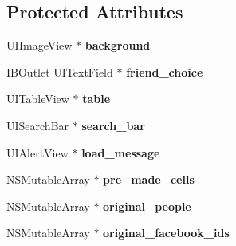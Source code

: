 \subsection*{\-Protected \-Attributes}
\begin{DoxyCompactItemize}
\item 
\hypertarget{interface_facebook_broadcast_aa285a74c8c6922e963c04224a41bb7f3}{
\-U\-I\-Image\-View $\ast$ {\bfseries background}}
\label{interface_facebook_broadcast_aa285a74c8c6922e963c04224a41bb7f3}

\item 
\hypertarget{interface_facebook_broadcast_a4e4c8f5c0d24783d8f0f51e0a1a0b6df}{
\-I\-B\-Outlet \-U\-I\-Text\-Field $\ast$ {\bfseries friend\-\_\-choice}}
\label{interface_facebook_broadcast_a4e4c8f5c0d24783d8f0f51e0a1a0b6df}

\item 
\hypertarget{interface_facebook_broadcast_a882d2009e99cdd208df9c0e02ed79bf1}{
\-U\-I\-Table\-View $\ast$ {\bfseries table}}
\label{interface_facebook_broadcast_a882d2009e99cdd208df9c0e02ed79bf1}

\item 
\hypertarget{interface_facebook_broadcast_afa0ab786b9bdade4168629a4170b6ca6}{
\-U\-I\-Search\-Bar $\ast$ {\bfseries search\-\_\-bar}}
\label{interface_facebook_broadcast_afa0ab786b9bdade4168629a4170b6ca6}

\item 
\hypertarget{interface_facebook_broadcast_a70da6aa2cae30d5ac37dd2927c7aa676}{
\-U\-I\-Alert\-View $\ast$ {\bfseries load\-\_\-message}}
\label{interface_facebook_broadcast_a70da6aa2cae30d5ac37dd2927c7aa676}

\item 
\hypertarget{interface_facebook_broadcast_a2af2f2517a41acf1ee288cbb14dbb48b}{
\-N\-S\-Mutable\-Array $\ast$ {\bfseries pre\-\_\-made\-\_\-cells}}
\label{interface_facebook_broadcast_a2af2f2517a41acf1ee288cbb14dbb48b}

\item 
\hypertarget{interface_facebook_broadcast_a4fd424091c63e2bfe78f02f6765e6038}{
\-N\-S\-Mutable\-Array $\ast$ {\bfseries original\-\_\-people}}
\label{interface_facebook_broadcast_a4fd424091c63e2bfe78f02f6765e6038}

\item 
\hypertarget{interface_facebook_broadcast_afefab8aec88628f3017cb0756bd5d355}{
\-N\-S\-Mutable\-Array $\ast$ {\bfseries original\-\_\-facebook\-\_\-ids}}
\label{interface_facebook_broadcast_afefab8aec88628f3017cb0756bd5d355}


\end{DoxyCompactItemize}
